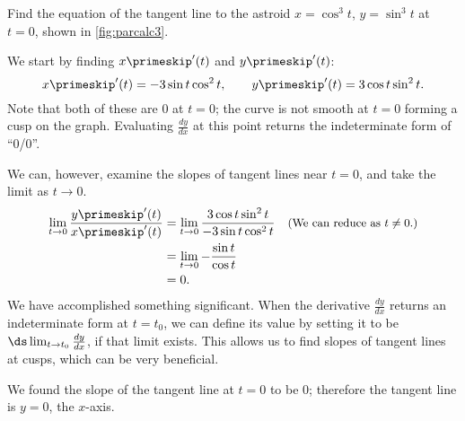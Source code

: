 {Find the equation of the tangent line to the astroid $x=\cos^3 t$, $y=\sin^3t$ at $t=0$, shown in \autoref{fig:parcalc3}.
%
%
}
{We start by finding $x\primeskip'(t)$ and $y\primeskip'(t)$:
\[x\primeskip'(t) = -3\sin t\cos^2t, \qquad y\primeskip'(t) = 3\cos t\sin^2t.\]
Note that both of these are 0 at $t=0$; the curve is not smooth at $t=0$ forming a cusp on the graph. Evaluating $\frac{dy}{dx}$ at this point returns the indeterminate form of ``0/0''. 

We can, however, examine the slopes of tangent lines near $t=0$, and take the limit as $t\to 0$. 
\begin{align*}
	\lim_{t\to0} \frac{y\primeskip'(t)}{x\primeskip'(t)}
	&=\lim_{t\to0} \frac{3\cos t\sin^2t}{-3\sin t\cos^2t}
	\quad \text{\small (We can reduce as $t\neq 0$.)}\\
	&= \lim_{t\to0} -\frac{\sin t}{\cos t}\\
	&= 0.
\end{align*}
We have accomplished something significant. When the derivative $\frac{dy}{dx}$ returns an indeterminate form at $t=t_0$, we can define its value by setting it to be $\ds \lim_{t\to t_0}\frac{dy}{dx}$, if that limit exists. This allows us to find slopes of tangent lines at cusps, which can be very beneficial. 

We found the slope of the tangent line at $t=0$ to be 0; therefore the tangent line is $y=0$, the $x$-axis.}

